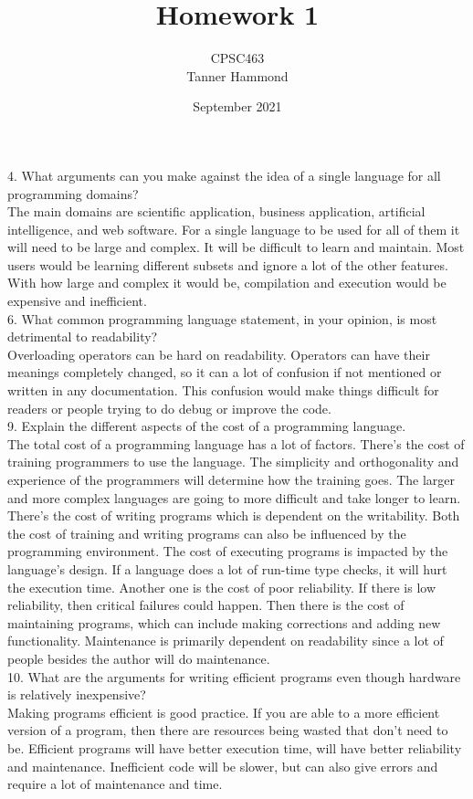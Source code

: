 \documentclass{article}
\title{Homework 1}
\author{CPSC463\\
        Tanner Hammond}
\date{September 2021}
\begin{document}
\maketitle

4. What arguments can you make against the idea of a single language for
all programming domains?\\
The main domains are scientific application, business application, artificial intelligence, and web software. For a single language to be used for all of them it will need to be large and complex. It will be difficult to learn and maintain. Most users would be learning different subsets and ignore a lot of the other features. With how large and complex it would be, compilation and execution would be expensive and inefficient. \\

6. What common programming language statement, in your opinion, is
most detrimental to readability? \\
Overloading operators can be hard on readability. Operators can have their meanings completely changed, so it can a lot of confusion if not mentioned or written in any documentation. This confusion would make things difficult for readers or people trying to do debug or improve the code.\\

9. Explain the different aspects of the cost of a programming language. \\
The total cost of a programming language has a lot of factors. There's the cost of training programmers to use the language. The simplicity and orthogonality and experience of the programmers will determine how the training goes. The larger and more complex languages are going to more difficult and take longer to learn. There's the cost of writing programs which is dependent on the writability. Both the cost of training and writing programs can also be influenced by the programming environment. The cost of executing programs is impacted by the language's design. If a language does a lot of run-time type checks, it will hurt the execution time. Another one is the cost of poor reliability. If there is low reliability, then critical failures could happen. Then there is the cost of maintaining programs, which can include making corrections and adding new functionality. Maintenance is primarily dependent on readability since a lot of people besides the author will do maintenance. \\

10. What are the arguments for writing efficient programs even though
hardware is relatively inexpensive? \\
Making programs efficient is good practice. If you are able to a more efficient version of a program, then there are resources being wasted that don't need to be. Efficient programs will have better execution time, will have better reliability and maintenance. Inefficient code will be slower, but can also give errors and require a lot of maintenance and time.\\
\end{document}
